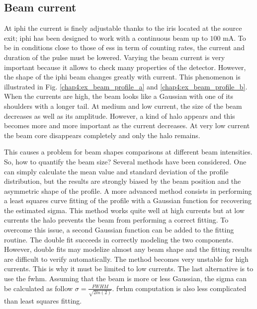 \begin{refsection}
  \subsection{Beam current}
  \label{chap4:sec:current}
  At \acrshort{iphi} the current is finely adjustable thanks to the iris located at the source exit; \acrshort{iphi} has been designed to work with a continuous beam up to $100$ $\mathrm{mA}$. To be in conditions close to those of \acrshort{ess} in term of counting rates, the current and duration of the pulse must be lowered. Varying the beam current is very important because it allows to check many properties of the detector. However, the shape of the \acrshort{iphi} beam changes greatly with current. This phenomenon is illustrated in Fig. \ref{chap4:ex_beam_profile_a} and \ref{chap4:ex_beam_profile_b}. When the currents are high, the beam looks like a Gaussian with one of its shoulders with a longer tail. At medium and low current, the size of the beam decreases as well as its amplitude. However, a kind of halo appears and this becomes more and more important as the current decreases. At very low current the beam core disappears completely and only the halo remains.

  

  This causes a problem for beam shapes comparisons at different beam intensities. So, how to quantify the beam size? Several methods have been considered. One can simply calculate the mean value and standard deviation of the profile distribution, but the results are strongly biased by the beam position and the asymmetric shape of the profile. A more advanced method consists in performing a least squares curve fitting of the profile with a Gaussian function for recovering the estimated sigma. This method works quite well at high currents but at low currents the halo prevents the beam from performing a correct fitting. To overcome this issue, a second Gaussian function can be added to the fitting routine. The double fit succeeds in correctly modeling the two components. However, double fits may modelize almost any beam shape and the fitting results are difficult to verify automatically. The method becomes very unstable for high currents. This is why it must be limited to low currents. The last alternative is to use the \acrfull{fwhm}. Assuming that the beam is more or less Gaussian, the sigma can be calculated as follow $\sigma = \frac{FWHM}{\sqrt{2ln(2)}}$. \acrshort{fwhm} computation is also less complicated than least squares fitting.


\end{refsection}
